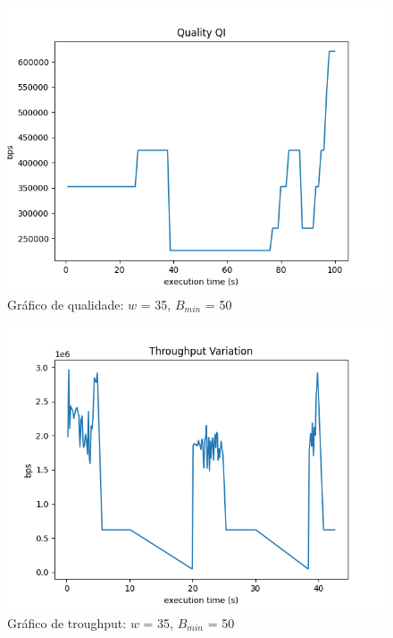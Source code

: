 \documentclass[10pt,twocolumn,letterpaper]{article}
\begin{document}
\begin{figure}
	\centering
	\includegraphics[width=\linewidth]{0.35 - 50 - qual.png}
	\caption{Gráfico de qualidade: $w$ = 35, $B_{min}$ = 50}
	\label{fig:3}
\end{figure}
\begin{figure}
	\centering
	\includegraphics[width=\linewidth]{0.35 - 50 - Throughput .png}
	\caption{Gráfico de troughput: $w$ = 35, $B_{min}$ = 50}
	\label{fig:4}
\end{figure}
\end{document}
